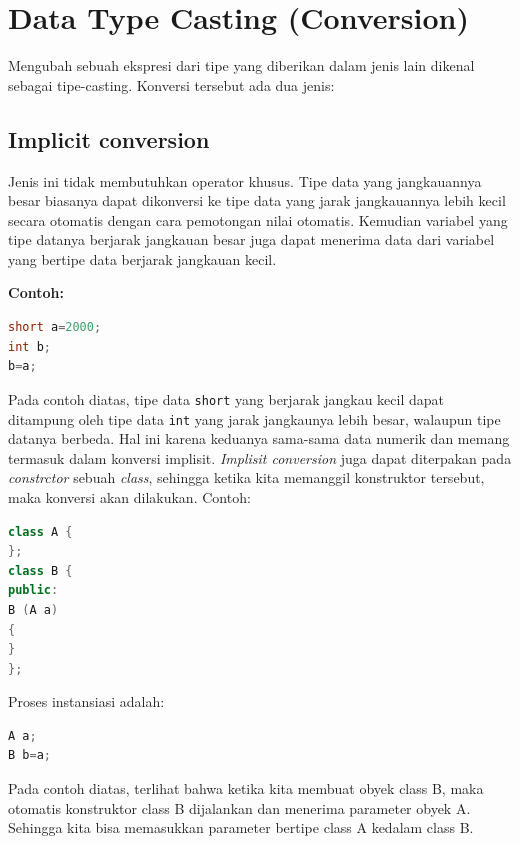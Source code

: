 \section{Data Type Casting (Conversion)}\label{data-type-casting-conversion}

Mengubah sebuah ekspresi dari tipe yang diberikan dalam jenis lain
dikenal sebagai tipe-casting. Konversi tersebut ada dua jenis:

\subsection{Implicit conversion}\label{implicit-conversion}

Jenis ini tidak membutuhkan operator khusus. Tipe data yang jangkauannya
besar biasanya dapat dikonversi ke tipe data yang jarak jangkauannya
lebih kecil secara otomatis dengan cara pemotongan nilai otomatis.
Kemudian variabel yang tipe datanya berjarak jangkauan besar juga dapat
menerima data dari variabel yang bertipe data berjarak jangkauan kecil.

\textbf{Contoh:}

\begin{lstlisting}[language=c++, numbers=none]
short a=2000;
int b;
b=a;
\end{lstlisting}

Pada contoh diatas, tipe data \texttt{short} yang berjarak jangkau kecil
dapat ditampung oleh tipe data \texttt{int} yang jarak jangkaunya lebih
besar, walaupun tipe datanya berbeda. Hal ini karena keduanya sama-sama
data numerik dan memang termasuk dalam konversi implisit. \emph{Implisit
conversion} juga dapat diterpakan pada \emph{constrctor} sebuah
\emph{class}, sehingga ketika kita memanggil konstruktor tersebut, maka
konversi akan dilakukan. Contoh:

\begin{lstlisting}[language=c++, numbers=none]
class A {
};
class B {
public:
B (A a)
{
}
};
\end{lstlisting}

Proses instansiasi adalah:

\begin{lstlisting}[language=c++, numbers=none]
A a;
B b=a;
\end{lstlisting}

Pada contoh diatas, terlihat bahwa ketika kita membuat obyek class B,
maka otomatis konstruktor class B dijalankan dan menerima parameter
obyek A. Sehingga kita bisa memasukkan parameter bertipe class A kedalam
class B.

